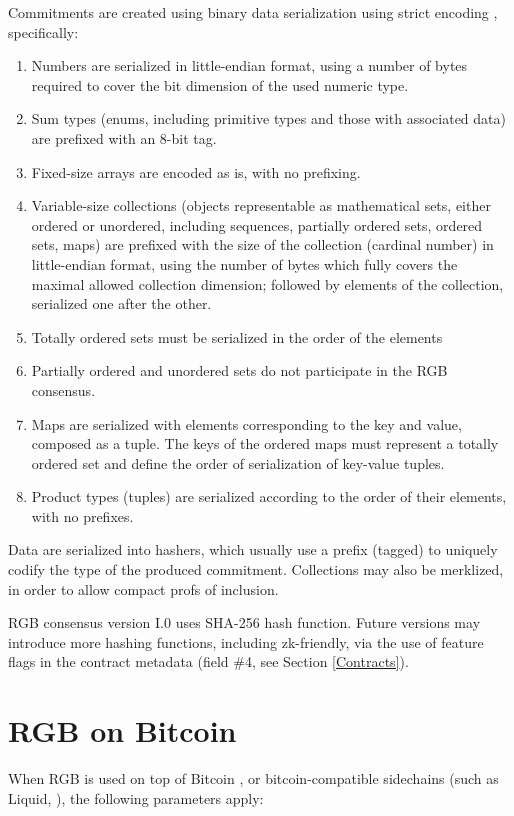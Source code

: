 \documentclass[9pt,oneside]{amsart}
\begin{document}
\begin{multicols}{2}
Commitments are created using binary data serialization using strict encoding \cite{strict},
specifically:
\begin{enumerate}
\item Numbers are serialized in little-endian format,
   using a number of bytes required to cover the bit dimension of the used numeric type.
\item Sum types (enums, including primitive types and those with associated data)
   are prefixed with an 8-bit tag.
\item Fixed-size arrays are encoded as is, with no prefixing.
\item Variable-size collections (objects representable as mathematical sets,
   either ordered or unordered, including sequences, partially ordered sets, ordered sets, maps)
   are prefixed with the size of the collection (cardinal number) in little-endian format,
   using the number of bytes which fully covers the maximal allowed collection dimension;
   followed by elements of the collection, serialized one after the other.
\item Totally ordered sets must be serialized in the order of the elements
\item Partially ordered and unordered sets do not participate in the RGB consensus.
\item Maps are serialized with elements corresponding to the key and value, composed as a tuple.
   The keys of the ordered maps must represent a totally ordered set
   and define the order of serialization of key-value tuples.
\item Product types (tuples) are serialized according to the order of their elements,
   with no prefixes.
\end{enumerate}

Data are serialized into hashers,
which usually use a prefix (tagged) to uniquely codify the type of the produced commitment.
Collections may also be merklized, in order to allow compact profs of inclusion.

RGB consensus version I.0 uses SHA-256 hash function.
Future versions may introduce more hashing functions, including zk-friendly,
via the use of feature flags in the contract metadata (field \#4, see Section \ref{Contracts}).


\section{RGB on Bitcoin}

When RGB is used on top of Bitcoin \cite{Bitcoin},
or bitcoin-compatible sidechains (such as Liquid, \cite{Liquid}),
the following parameters apply:


\end{multicols}
\end{document}
